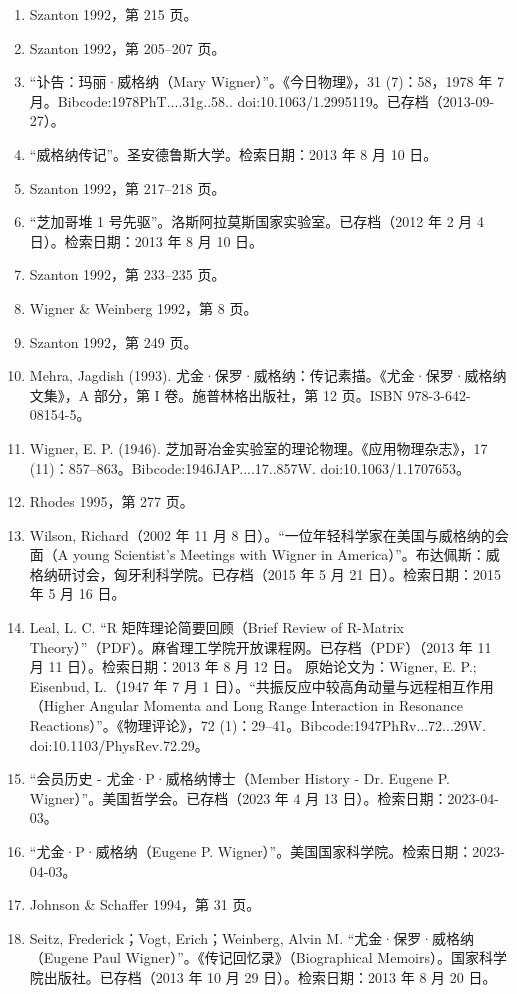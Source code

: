 \begin{enumerate}
\item Szanton 1992，第 215 页。
\item Szanton 1992，第 205–207 页。
\item “讣告：玛丽·威格纳（Mary Wigner）”。《今日物理》，31 (7)：58，1978 年 7 月。Bibcode:1978PhT....31g..58.. doi:10.1063/1.2995119。已存档（2013-09-27）。
\item “威格纳传记”。圣安德鲁斯大学。检索日期：2013 年 8 月 10 日。
\item Szanton 1992，第 217–218 页。
\item “芝加哥堆 1 号先驱”。洛斯阿拉莫斯国家实验室。已存档（2012 年 2 月 4 日）。检索日期：2013 年 8 月 10 日。
\item Szanton 1992，第 233–235 页。
\item Wigner & Weinberg 1992，第 8 页。
\item Szanton 1992，第 249 页。
\item Mehra, Jagdish (1993). 尤金·保罗·威格纳：传记素描。《尤金·保罗·威格纳文集》，A 部分，第 I 卷。施普林格出版社，第 12 页。ISBN 978-3-642-08154-5。
\item Wigner, E. P. (1946). 芝加哥冶金实验室的理论物理。《应用物理杂志》，17 (11)：857–863。Bibcode:1946JAP....17..857W. doi:10.1063/1.1707653。
\item Rhodes 1995，第 277 页。
\item Wilson, Richard（2002 年 11 月 8 日）。“一位年轻科学家在美国与威格纳的会面（A young Scientist's Meetings with Wigner in America）”。布达佩斯：威格纳研讨会，匈牙利科学院。已存档（2015 年 5 月 21 日）。检索日期：2015 年 5 月 16 日。
\item Leal, L. C. “R 矩阵理论简要回顾（Brief Review of R-Matrix Theory）”（PDF）。麻省理工学院开放课程网。已存档（PDF）（2013 年 11 月 11 日）。检索日期：2013 年 8 月 12 日。
原始论文为：Wigner, E. P.; Eisenbud, L.（1947 年 7 月 1 日）。“共振反应中较高角动量与远程相互作用（Higher Angular Momenta and Long Range Interaction in Resonance Reactions）”。《物理评论》，72 (1)：29–41。Bibcode:1947PhRv...72...29W. doi:10.1103/PhysRev.72.29。
\item “会员历史 - 尤金·P·威格纳博士（Member History - Dr. Eugene P. Wigner）”。美国哲学会。已存档（2023 年 4 月 13 日）。检索日期：2023-04-03。
\item “尤金·P·威格纳（Eugene P. Wigner）”。美国国家科学院。检索日期：2023-04-03。
\item Johnson & Schaffer 1994，第 31 页。
\item Seitz, Frederick；Vogt, Erich；Weinberg, Alvin M. “尤金·保罗·威格纳（Eugene Paul Wigner）”。《传记回忆录》（Biographical Memoirs）。国家科学院出版社。已存档（2013 年 10 月 29 日）。检索日期：2013 年 8 月 20 日。

\end{enumerate}
